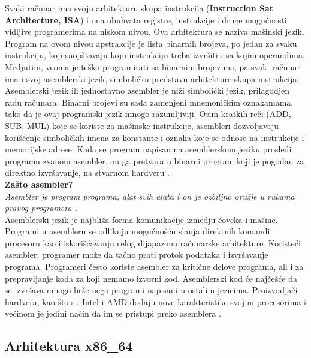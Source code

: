 \documentclass[a4paper]{article}
\begin{document}
Svaki ra\v cunar ima svoju arhitekturu skupa instrukcija (\textbf{Instruction Sat Architecture, ISA}) i ona obuhvata registre, 
instrukcije i druge mogu\' cnosti vidljive programerima na niskom nivou. Ova arhitektura se naziva ma\v sinski jezik. 
Program na ovom nivou apstrakcije je lista binarnih brojeva, po jedan za svaku instrukciju, koji saop\v stavaju koju 
instrukciju treba izvr\v siti i sa kojim operandima. Medjutim, veoma je te\v sko programirati sa binarnim brojevima,
pa svaki ra\v cunar ima i svoj asemblerski jezik, simboli\v cku predstavu arhitekture skupa instrukcija.
Asemblerski jezik ili jednostavno asembler je ni\v zi simboli\v cki jezik, prilagodjen radu ra\v cunara.
Binarni brojevi su sada zamenjeni mnemoni\v ckim oznakamama, tako da je ovaj programski jezik mnogo razumljiviji. 
Osim kratkih re\v ci (ADD, SUB, MUL) koje se koriste za ma\v sinske instrukcije, asembleri dozvoljavaju kori\v s\' cenje 
simboli\v ckih imena za konstante i oznaka koje se odnose na instrukcije i memorijske adrese. Kada se program napisan na 
asemblerskom jeziku prosledi programu zvanom asembler, on ga pretvara u binarni program koji je pogodan za direktno 
izvr\v savanje, na stvarnom hardveru \cite{Arhitektura}. \\ 
\textbf {Za\v sto asembler?} \\
\emph {Asembler je program programa, alat svih alata i on je ozbiljno oru\v zje u rukama pravog programera \cite{Arhitektura}.} \\ 
Asemblerski jezik je najbli\v za forma komunikacije izmedju \v coveka i ma\v sine. Programi u asembleru se odlikuju
mogu\' cno\v s\' cu slanja direktnih komandi procesoru kao i iskori\v s\' cavanju celog dijapazona ra\v cunarske 
arhitekture. Koriste\' ci asembler, programer mo\v ze da ta\v cno prati protok podataka i izvr\v savanje programa.
Programeri \v cesto koriste asembler za kriti\v cne delove programa, ali i  za prepravljanje koda za koji nemamo
izvorni kod. Asemblerski kod \' ce naj\v ce\v s\' ce da se izvr\v sava mnogo br\v ze nego programi napisani u ostalim jezicima.
Proizvodja\v ci hardvera, kao \v sto su Intel i AMD dodaju nove karakteristike svojim procesorima i ve\' cinom je jedini 
na\v cin da im se pristupi preko asemblera \cite{Introduction}. \\

\subsection{\textbf{Arhitektura x86\_64}}
\end{document}
